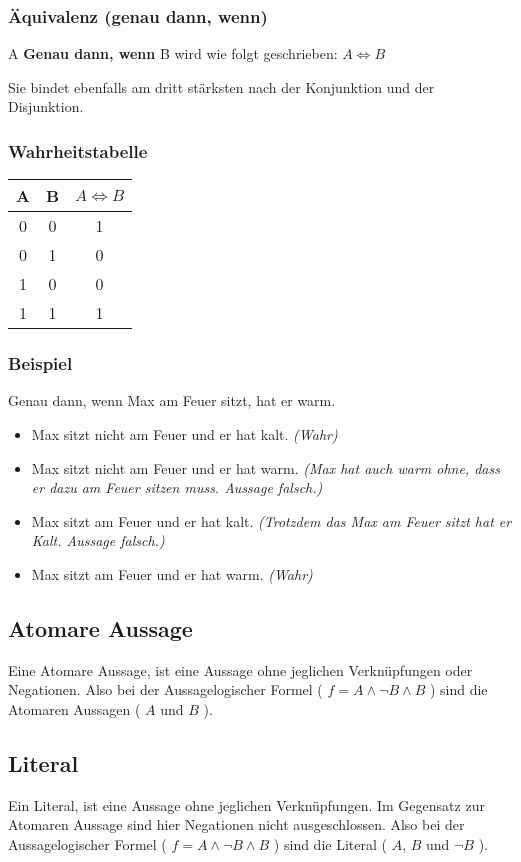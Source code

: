 \documentclass[a4paper,12pt]{article}
\begin{document}
\subsubsection{Äquivalenz (genau dann, wenn)}

A \textbf{Genau dann, wenn} B wird wie folgt geschrieben: \( A \iff B \)

Sie bindet ebenfalls am dritt stärksten nach der Konjunktion und der Disjunktion.
\subsubsection*{Wahrheitstabelle}
\begin{tabular}{c|c || c}
  A & B & \( A \iff B \) \\
  \hline
  0 & 0 & 1 \\
  0 & 1 & 0\\
  1 & 0 & 0\\
  1 & 1 & 1\\
\end{tabular}\break

\subsubsection*{Beispiel}
Genau dann, wenn Max am Feuer sitzt, hat er warm.
\begin{itemize}
  \item Max sitzt nicht am Feuer und er hat kalt. 
  \textit{(Wahr)}
  \item Max sitzt nicht am Feuer und er hat warm. 
  \textit{(Max hat auch warm ohne, dass er dazu am Feuer sitzen muss. Aussage falsch.)}
  \item Max sitzt am Feuer und er hat kalt. 
  \textit{(Trotzdem das Max am Feuer sitzt hat er Kalt. Aussage falsch.)}
  \item Max sitzt am Feuer und er hat warm. \textit{(Wahr)}
\end{itemize}
\subsection{Atomare Aussage}
Eine Atomare Aussage, ist eine Aussage ohne jeglichen Verknüpfungen oder Negationen. Also bei der Aussagelogischer Formel ( \(f = A \land \neg B \land B\) ) sind die Atomaren Aussagen ( \(A\) und \(B\) ).

\subsection{Literal}
Ein Literal, ist eine Aussage ohne jeglichen Verknüpfungen. Im Gegensatz zur Atomaren Aussage sind hier Negationen nicht ausgeschlossen. Also bei der Aussagelogischer Formel ( \(f = A \land \neg B \land B\) ) sind die Literal ( \(A\), \(B\) und \(\neg B\) ).
\end{document}
